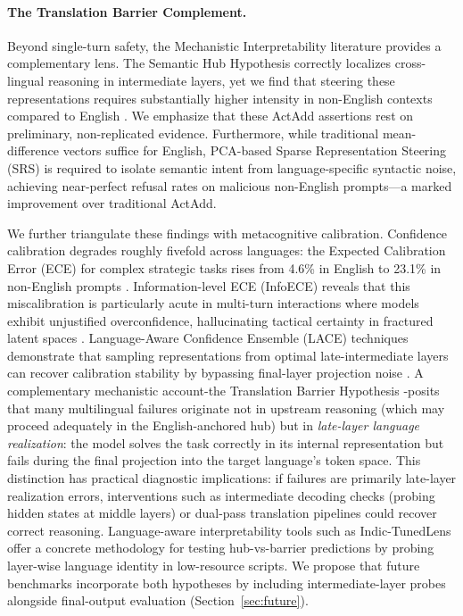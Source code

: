 \documentclass[11pt]{article}
\begin{document}
\paragraph{The Translation Barrier Complement.} Beyond single-turn safety, the Mechanistic Interpretability literature provides a complementary lens. The Semantic Hub Hypothesis correctly localizes cross-lingual reasoning in intermediate layers, yet we find that steering these representations requires substantially higher intensity in non-English contexts compared to English \citep{wu2024semantichub, turner2023actadd}. We emphasize that these ActAdd assertions rest on preliminary, non-replicated evidence. Furthermore, while traditional mean-difference vectors suffice for English, PCA-based Sparse Representation Steering (SRS) \citep{lee2025sparse} is required to isolate semantic intent from language-specific syntactic noise, achieving near-perfect refusal rates on malicious non-English prompts---a marked improvement over traditional ActAdd.

We further triangulate these findings with metacognitive calibration. Confidence calibration degrades roughly fivefold across languages: the Expected Calibration Error (ECE) for complex strategic tasks rises from 4.6\% in English to 23.1\% in non-English prompts \citep{ahuja2022calibration}. Information-level ECE (InfoECE) reveals that this miscalibration is particularly acute in multi-turn interactions where models exhibit unjustified overconfidence, hallucinating tactical certainty in fractured latent spaces \citep{zhang2026confidence}. Language-Aware Confidence Ensemble (LACE) techniques demonstrate that sampling representations from optimal late-intermediate layers can recover calibration stability by bypassing final-layer projection noise \citep{zhou2025beyond}.
A complementary mechanistic account-the Translation Barrier Hypothesis \citep{bafna2025translationbarrier}-posits that many multilingual failures originate not in upstream reasoning (which may proceed adequately in the English-anchored hub) but in \textit{late-layer language realization}: the model solves the task correctly in its internal representation but fails during the final projection into the target language's token space. This distinction has practical diagnostic implications: if failures are primarily late-layer realization errors, interventions such as intermediate decoding checks (probing hidden states at middle layers) or dual-pass translation pipelines could recover correct reasoning. Language-aware interpretability tools such as Indic-TunedLens \citep{kumar2025indictunedlens} offer a concrete methodology for testing hub-vs-barrier predictions by probing layer-wise language identity in low-resource scripts. We propose that future benchmarks incorporate both hypotheses by including intermediate-layer probes alongside final-output evaluation (Section~\ref{sec:future}).
\end{document}
